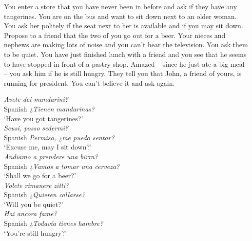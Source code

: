 {\begin{exe}
 You enter a store that you have never been in before and ask if they have any tangerines.
 You are on the bus and want to sit down next to an older woman. You ask her politely if the seat next to her is available and if you may sit down.
 Propose to a friend that the two of you go out for a beer.
 Your nieces and nephews are making lots of noise and you can’t hear the television. You ask them to be quiet.
 You have just finished lunch with a friend and you see that he seems to have stopped in front of a pastry shop. Amazed -- since he just ate a big meal -- you ask him if he is still hungry.
 They tell you that John, a friend of yours, is running for president. You can’t believe it and ask again.
\end{exe}}



\ea\label{ex:4:8}     \textit{Avete dei mandarini?}\\
Spanish   \textit{¿Tienen mandarinas?}\\
{}      {‘Have you got tangerines?’}\\



\ex\label{ex:4:9}     \textit{Scusi, posso sedermi?}\\
Spanish   \textit{Permiso, ¿me puedo sentar?}\\
{}      {‘Excuse me, may I sit down?’}\\



\ex\label{ex:4:10}     \textit{Andiamo a prendere una birra?}\\
Spanish   \textit{¿Vamos a tomar una cerveza?}\\
{}      {‘Shall we go for a beer?’}\\



\ex\label{ex:4:11}     \textit{Volete rimanere zitti?}\\
Spanish   \textit{¿Quieren callarse?}\\
{}      {‘Will you be quiet?'}\\



\ex\label{ex:4:12}     \textit{Hai ancora fame?}\\
Spanish   \textit{¿Todavía tienes hambre?}\\
{}      {‘You’re still hungry?’}\\




